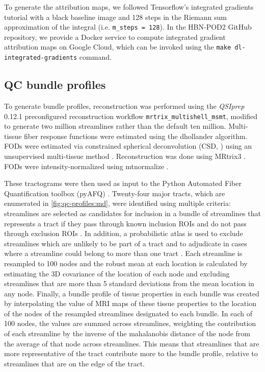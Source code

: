 \documentclass[fleqn,10pt]{wlscirep}
\begin{document}
To generate the attribution maps, we followed Tensorflow's integrated gradients
tutorial \cite{integrated-gradients-tutorial} with a black baseline image and
128 steps in the Riemann sum approximation of the integral (i.e.
\texttt{m\_steps = 128}). In the HBN-POD2 GitHub repository, we provide a Docker
service to compute integrated gradient attribution maps on Google Cloud, which
can be invoked using the \texttt{make dl-integrated-gradients} command.

\subsection*{QC bundle profiles}

To generate bundle profiles, reconstruction was performed using the
\emph{QSIprep} 0.12.1 preconfigured reconstruction workflow
\texttt{mrtrix\_multishell\_msmt}, modified to generate two million streamlines
rather than the default ten million. Multi-tissue fiber response functions were
estimated using the dhollander algorithm. FODs were estimated via constrained
spherical deconvolution (CSD, \cite{originalcsd, tournier2008csd}) using an
unsupervised multi-tissue method \cite{dhollander2019response,
dhollander2016unsupervised}. Reconstruction was done using MRtrix3
\cite{mrtrix3}. FODs were intensity-normalized using mtnormalize
\cite{mtnormalize}.

These tractograms were then used as input to the Python Automated Fiber
Quantification toolbox (pyAFQ) \cite{kruper2021evaluating}. Twenty-four major
tracts, which are enumerated in \ref{fig:qc-profiles:md}, were identified using
multiple criteria: streamlines are selected as candidates for inclusion in a
bundle of streamlines that represents a tract if they pass through known
inclusion ROIs and do not pass through exclusion ROIs \cite{Wakana2007-nw}. In
addition, a probabilistic atlas is used to exclude streamlines which are
unlikely to be part of a tract and to adjudicate in cases where a streamline
could belong to more than one tract \cite{Hua2008-di}. Each streamline is
resampled to 100 nodes and the robust mean at each location is calculated by
estimating the 3D covariance of the location of each node and excluding
streamlines that are more than 5 standard deviations from the mean location in
any node. Finally, a bundle profile of tissue properties in each bundle was
created by interpolating the value of MRI maps of these tissue properties to the
location of the nodes of the resampled streamlines designated to each bundle. In
each of 100 nodes, the values are summed across streamlines, weighting the
contribution of each streamline by the inverse of the mahalanobis distance of
the node from the average of that node across streamlines. This means that
streamlines that are more representative of the tract contribute more to the
bundle profile, relative to streamlines that are on the edge of the tract.
\end{document}
